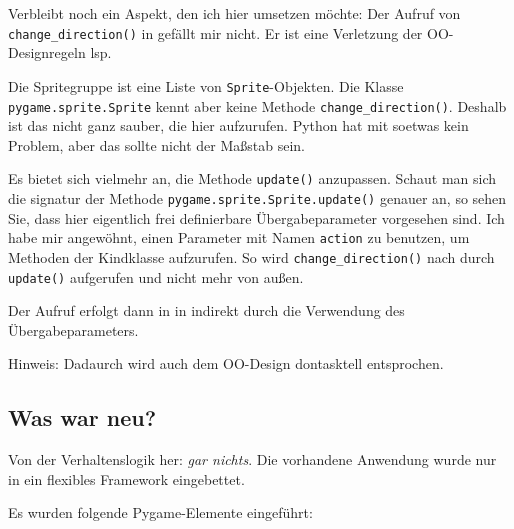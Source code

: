 Verbleibt noch ein Aspekt, den ich hier umsetzen möchte: Der Aufruf von \texttt{change\_di\-rec\-tion()} in  gefällt mir nicht. Er ist eine Verletzung der OO-Designregeln \Gls{lsp}. 

Die Spritegruppe ist eine Liste von \texttt{Sprite}-Objekten. Die Klasse \texttt{pygame.sprite.Sprite} kennt aber keine Methode \texttt{change\_direction()}. Deshalb ist das nicht ganz sauber, die hier aufzurufen. Python hat mit soetwas kein Problem, aber das sollte nicht der Maßstab sein. 

Es bietet sich vielmehr an, die Methode \texttt{update()} anzupassen. Schaut man sich die \gls{signatur} der Methode \texttt{pygame.sprite.Sprite.update()} genauer an, so sehen Sie, dass hier eigentlich frei definierbare Übergabeparameter vorgesehen sind.  Ich habe mir angewöhnt, einen Parameter mit Namen \texttt{action} zu benutzen, um Methoden der Kindklasse aufzurufen. So wird \texttt{change\_direction()} nach  durch \texttt{update()} aufgerufen und nicht mehr von außen.


Der Aufruf erfolgt dann in  in  indirekt durch die Verwendung des Übergabeparameters.

Hinweis: Dadaurch wird auch dem OO-Design \Gls{dontasktell} entsprochen.


\subsection*{Was war neu?}

Von der Verhaltenslogik her: \emph{gar nichts}. Die vorhandene Anwendung wurde nur in ein flexibles Framework eingebettet. 

Es wurden folgende Pygame-Elemente eingeführt:

